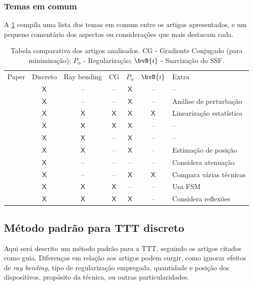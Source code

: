 \subsubsection{Temas em comum}
%
\def\X{\ensuremath{\mathsf{X}}}
%
A \cref{table:fttt_revisao_temas} compila uma lista dos temas em comum entre os artigos apresentados, e um pequeno comentário dos aspectos ou considerações que mais destacam cada.

\begin{table}[H]\small\centering
	\caption{Tabela comparativa dos artigos analisados. CG - Gradiente Conjugado (para minimização); $P_{\alpha}$ - Regularização; $\bvB{i}$ - Suavização do SSF.}
	\label{table:fttt_revisao_temas}
	\begin{tabular}{l c c c c c l}
		Paper 								& Discreto 	& Ray bending 	& CG 	& $P_{\alpha}$ 	& $\bvB{i}$ & Extra 	\\
		\cite{aki_determination_1976} 		& \X 		& -- 			& --	& \X			& --		& --		\\
		\cite{aki_determination_1977} 		& \X 		& -- 			& --	& \X			& --		& Análise de perturbação		\\
		\cite{ali_opensource_2019}			& \X		& \X			& \X	& \X			& \X		& Linearização estatística \\
		\cite{hormati_robust_2010}			& \X 		& \X			& \X	& \X			& --		& --		\\
		\cite{jeong_investigating_2024}	& \X		& \X			& --	& \X			& --		& --		\\
		\cite{hellmann_borehole_2023}		& \X		& \X			& --	& \X			& --		& Estimação de posição	\\
		\cite{dines_computerized_1979}		& \X		& --			& --	& --			& --		& Considera atenuação\\
		\cite{phillips_traveltime_1991}	& \X		& --			& --	& \X			& \X		& Compara várias técnicas	\\
		\cite{tang_travel_2024}			& \X		& \X			& \X	& --			& --		& Usa FSM \\
		\cite{zhang_inversion_2016}		& \X		& \X			& \X	& \X			& --		& Considera reflexões			
	\end{tabular}
\end{table}

\subsection{Método padrão para TTT discreto}
\label{sec_fttt:subsec_TTT-padrao}

Aqui será descrito um método padrão para a TTT, seguindo os artigos citados como guia. Diferenças em relação aos artigos podem surgir, como ignorar efeitos de \textit{ray bending}, tipo de regularização empregada, quantidade e posição dos dispositivos, propósito da técnica, ou outras particularidades.

